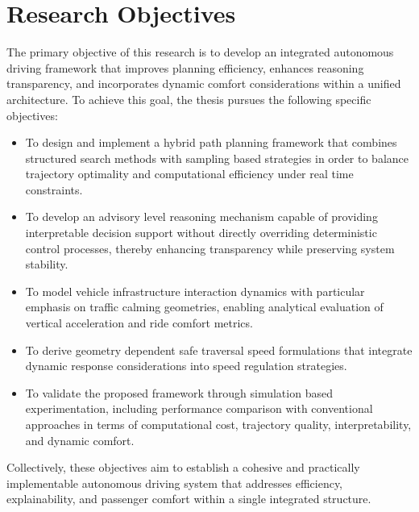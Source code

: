 \documentclass[a4paper,12pt,one side]{report}
\theoremstyle{definition}
\begin{document}
\section{Research Objectives}
The primary objective of this research is to develop an integrated autonomous driving framework that improves planning efficiency, enhances reasoning transparency, and incorporates dynamic comfort considerations within a unified architecture. To achieve this goal, the thesis pursues the following specific objectives:
\begin{itemize}
\item To design and implement a hybrid path planning framework that combines structured search methods with sampling based strategies in order to balance trajectory optimality and computational efficiency under real time constraints.
\item To develop an advisory level reasoning mechanism capable of providing interpretable decision support without directly overriding deterministic control processes, thereby enhancing transparency while preserving system stability.
\item To model vehicle infrastructure interaction dynamics with particular emphasis on traffic calming geometries, enabling analytical evaluation of vertical acceleration and ride comfort metrics.
\item To derive geometry dependent safe traversal speed formulations that integrate dynamic response considerations into speed regulation strategies.
\item To validate the proposed framework through simulation based experimentation, including performance comparison with conventional approaches in terms of computational cost, trajectory quality, interpretability, and dynamic comfort.
\end{itemize}
Collectively, these objectives aim to establish a cohesive and practically implementable autonomous driving system that addresses efficiency, explainability, and passenger comfort within a single integrated structure.
\end{document}
